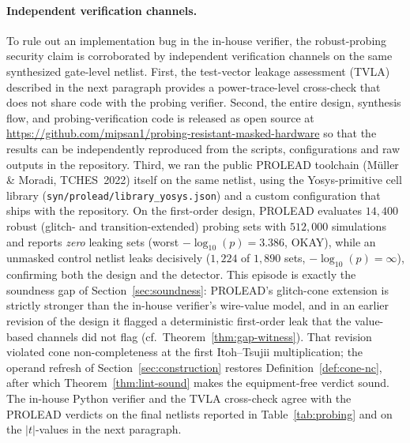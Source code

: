 \documentclass[lettersize,journal]{IEEEtran}
\begin{document}
\paragraph{Independent verification channels.}
To rule out an implementation bug in the in-house verifier, the
robust-probing security claim is corroborated by independent
verification channels on the same synthesized gate-level netlist.
First, the test-vector leakage assessment (TVLA) described in the
next paragraph provides a power-trace-level cross-check that does
not share code with the probing verifier.  Second, the entire
design, synthesis flow, and probing-verification code is released
as open source at
\url{https://github.com/mipsan1/probing-resistant-masked-hardware}
so that the results can be independently reproduced from the scripts,
configurations and raw outputs in the repository.  Third, we ran the public PROLEAD
toolchain (M\"uller \& Moradi, TCHES~2022) itself on the same
netlist, using the Yosys-primitive cell library
(\texttt{syn/prolead/library\_yosys.json}) and a custom
configuration that ships with the repository.  On the first-order
design, PROLEAD evaluates $14{,}400$ robust (glitch- and
transition-extended) probing sets with $512{,}000$ simulations and
reports \emph{zero} leaking sets (worst $-\log_{10}(p)=3.386$,
OKAY), while an unmasked control netlist leaks decisively
($1{,}224$ of $1{,}890$ sets, $-\log_{10}(p)=\infty$), confirming
both the design and the detector.  This episode is exactly the soundness gap of
Section~\ref{sec:soundness}: PROLEAD's glitch-cone extension is strictly
stronger than the in-house verifier's wire-value model, and in an earlier
revision of the design it flagged a deterministic first-order leak that the
value-based channels did not flag
(cf.\ Theorem~\ref{thm:gap-witness}). That revision violated cone
non-completeness at the first Itoh--Tsujii multiplication; the operand
refresh of Section~\ref{sec:construction} restores
Definition~\ref{def:cone-nc}, after which Theorem~\ref{thm:lint-sound}
makes the equipment-free verdict sound.  The in-house Python verifier and
the TVLA cross-check agree with the PROLEAD verdicts on the
final netlists reported
in Table~\ref{tab:probing} and on the $|t|$-values in the next
paragraph.
\end{document}
